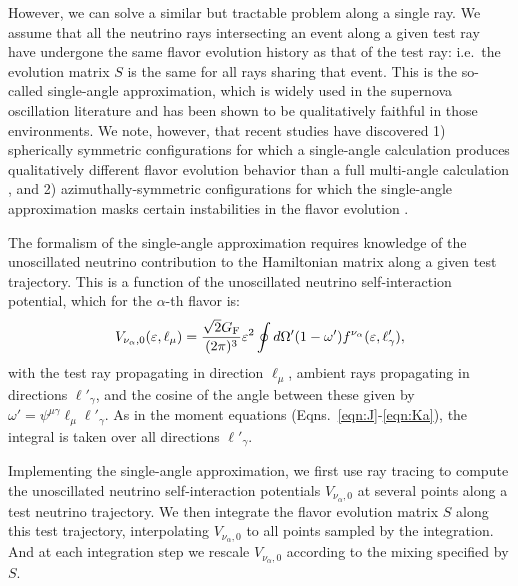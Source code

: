 \documentclass[aps,floatfix,prd,superscriptaddress,twocolumn]{revtex4-1}
\begin{document}
However, we can solve a similar but tractable problem along a single ray.
We assume that all the neutrino rays intersecting an event along a given test ray
have undergone the same flavor evolution history as that of the test ray:
i.e.\ the evolution matrix $S$ is the same for all rays sharing that event.
This is the so-called single-angle approximation,
which is widely used in the supernova oscillation literature
and has been shown to be qualitatively faithful in those environments.
We note, however, that recent studies have discovered 1) spherically symmetric
configurations for which a single-angle calculation produces qualitatively
different flavor evolution behavior than a full multi-angle calculation
\cite{vlas2018-multiangle},
and 2) azimuthally-symmetric configurations for which the single-angle
approximation masks certain instabilities
in the flavor evolution \cite{wu2017-fast_neutrino_conversions}.

The formalism of the single-angle approximation requires knowledge of
the unoscillated neutrino contribution to the Hamiltonian matrix
along a given test trajectory.
This is a function of the unoscillated neutrino self-interaction potential,
which for the $\alpha$-th flavor is:
\begin{equation}
  \label{eqn:V_nu_alpha}
  V_{\nu_\alpha,0}(\varepsilon,\ell_\mu) =
  \frac{\sqrt{2}G_{\rm F}}{(2\pi)^3} \varepsilon^2
  \oint d\Omega'(1-\omega')f^{\nu_\alpha}(\varepsilon,\ell'_\gamma),
\end{equation}
with the test ray propagating in direction $\ell_\mu$,
ambient rays propagating in directions $\ell'_\gamma$,
and the cosine of the angle between these given by
$\omega'=\psi^{\mu\gamma} \ell_\mu \ell'_\gamma$.
As in the moment equations (Eqns.~\ref{eqn:J}-\ref{eqn:Ka}),
the integral is taken over all directions $\ell'_\gamma$.

Implementing the single-angle approximation, we first use ray tracing to compute
the unoscillated neutrino self-interaction potentials $V_{\nu_\alpha,0}$
at several points along a test neutrino trajectory.
We then integrate the flavor evolution matrix $S$ along this test trajectory,
interpolating $V_{\nu_\alpha,0}$ to all points sampled by the integration.
And at each integration step we rescale $V_{\nu_\alpha,0}$ according to the
mixing specified by $S$.
\end{document}
